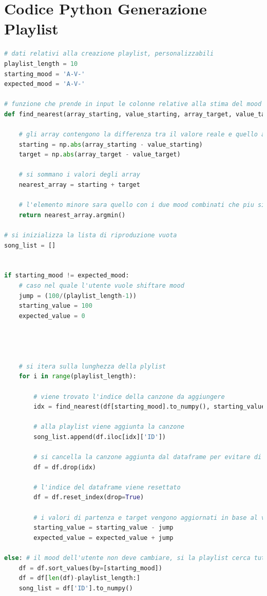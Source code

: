 \documentclass[11pt]{report}
\begin{document}
\chapter{Codice Python Generazione Playlist}
\begin{lstlisting}[language=Python, caption=Playlist-Generator.py]
# dati relativi alla creazione playlist, personalizzabili
playlist_length = 10
starting_mood = 'A-V-'
expected_mood = 'A-V-'

# funzione che prende in input le colonne relative alla stima del mood e il valore atteso a cui esse devono avvicinarsi
def find_nearest(array_starting, value_starting, array_target, value_target):
    
    # gli array contengono la differenza tra il valore reale e quello atteso
    starting = np.abs(array_starting - value_starting)
    target = np.abs(array_target - value_target)
    
    # si sommano i valori degli array
    nearest_array = starting + target
    
    # l'elemento minore sara quello con i due mood combinati che piu si avvicinano all obiettivo
    return nearest_array.argmin()

# si inizializza la lista di riproduzione vuota 
song_list = []


if starting_mood != expected_mood: 
    # caso nel quale l'utente vuole shiftare mood
    jump = (100/(playlist_length-1))
    starting_value = 100
    expected_value = 0




    # si itera sulla lunghezza della plylist
    for i in range(playlist_length):

        # viene trovato l'indice della canzone da aggiungere
        idx = find_nearest(df[starting_mood].to_numpy(), starting_value, df[expected_mood].to_numpy(), expected_value)
        
        # alla playlist viene aggiunta la canzone
        song_list.append(df.iloc[idx]['ID'])
        
        # si cancella la canzone aggiunta dal dataframe per evitare di aggiungerla due volte alla playlist
        df = df.drop(idx)
        
        # l'indice del dataframe viene resettato
        df = df.reset_index(drop=True)
        
        # i valori di partenza e target vengono aggiornati in base al valore del salto
        starting_value = starting_value - jump
        expected_value = expected_value + jump
        
else: # il mood dell'utente non deve cambiare, si la playlist cerca tutte le canzoni con il mood richiesto massimizzato
    df = df.sort_values(by=[starting_mood])
    df = df[len(df)-playlist_length:]
    song_list = df['ID'].to_numpy()
\end{lstlisting}




\end{document}
